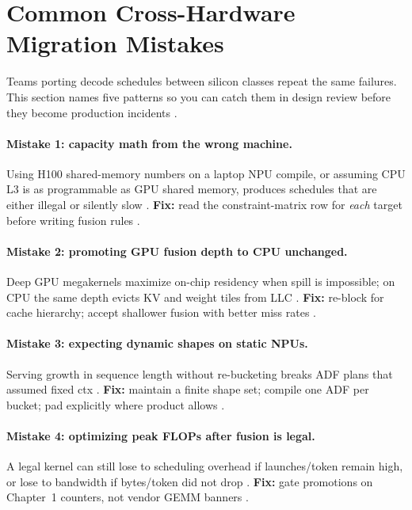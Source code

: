 \section{Common Cross-Hardware Migration Mistakes}
\label{sec:migration_mistakes}

Teams porting decode schedules between silicon classes repeat the same failures.
This section names five patterns so you can catch them in design review before they become production incidents \citep{patel2025llminference,yirage2026,chen2020compilerbasedhardw}.

\paragraph{Mistake 1: capacity math from the wrong machine.}
Using H100 shared-memory numbers on a laptop NPU compile, or assuming CPU L3 is as programmable as GPU shared memory, produces schedules that are either illegal or silently slow \citep{nvidia2022hopper,amd2024xdna,dlbook}.
\textbf{Fix:} read the constraint-matrix row for \emph{each} target before writing fusion rules \citep{yirage2026}.

\paragraph{Mistake 2: promoting GPU fusion depth to CPU unchanged.}
Deep GPU megakernels maximize on-chip residency when spill is impossible; on CPU the same depth evicts KV and weight tiles from LLC \citep{rotem2018glow,patel2025llminference,memoryfloor2026}.
\textbf{Fix:} re-block for cache hierarchy; accept shallower fusion with better miss rates \citep{dlbook}.

\paragraph{Mistake 3: expecting dynamic shapes on static NPUs.}
Serving growth in sequence length without re-bucketing breaks ADF plans that assumed fixed ctx \citep{lai2023relax,amd2024xdna}.
\textbf{Fix:} maintain a finite shape set; compile one ADF per bucket; pad explicitly where product allows \citep{yirage2026}.

\paragraph{Mistake 4: optimizing peak FLOPs after fusion is legal.}
A legal kernel can still lose to scheduling overhead if launches/token remain high, or lose to bandwidth if bytes/token did not drop \citep{taxbreak2026,memoryfloor2026}.
\textbf{Fix:} gate promotions on Chapter~1 counters, not vendor GEMM banners \citep{patel2025llminference}.

